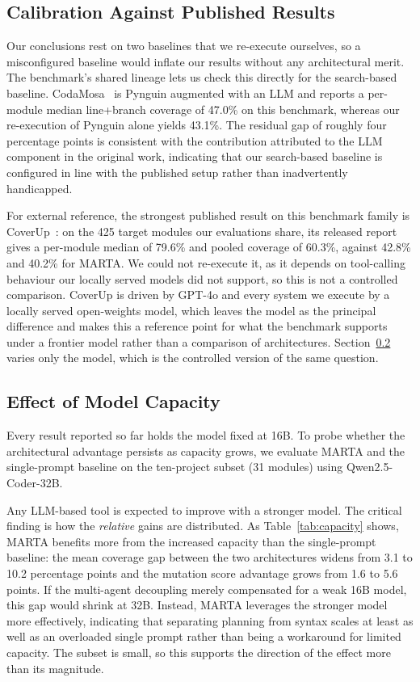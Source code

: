 \documentclass{llncs}
\begin{document}
\subsection{Calibration Against Published Results}
\label{sec:calibration}

Our conclusions rest on two baselines that we re-execute ourselves, so a
misconfigured baseline would inflate our results without any architectural merit.
The benchmark's shared lineage lets us check this directly for the search-based
baseline. CodaMosa~\cite{lemieux2023codamosa} is Pynguin augmented with an LLM and
reports a per-module median line+branch coverage of 47.0\% on this benchmark,
whereas our re-execution of Pynguin alone yields 43.1\%. The residual gap of roughly
four percentage points is consistent with the contribution attributed to the LLM
component in the original work, indicating that our search-based baseline is
configured in line with the published setup rather than inadvertently handicapped.

For external reference, the strongest published result on this benchmark family is
CoverUp~\cite{altmayer2025coverup}: on the 425 target modules our evaluations share,
its released report gives a per-module median of 79.6\% and pooled coverage of
60.3\%, against 42.8\% and 40.2\% for MARTA. We could not re-execute it, as it
depends on tool-calling behaviour our locally served models did not support, so this
is not a controlled comparison. CoverUp is driven by GPT-4o and every system we
execute by a locally served open-weights model, which leaves the model as the
principal difference and makes this a reference point for what the benchmark supports
under a frontier model rather than a comparison of architectures.
Section~\ref{sec:model-capacity} varies only the model, which is the controlled
version of the same question.


\subsection{Effect of Model Capacity}
\label{sec:model-capacity}

Every result reported so far holds the model fixed at 16B. To probe whether the architectural advantage persists as capacity grows, we evaluate MARTA and the single-prompt baseline on the ten-project subset (31 modules) using Qwen2.5-Coder-32B.

Any LLM-based tool is expected to improve with a stronger model. The critical finding
is how the \textit{relative} gains are distributed. As
Table~\ref{tab:capacity} shows, MARTA benefits more from the increased capacity than
the single-prompt baseline: the mean coverage gap between the two architectures widens
from 3.1 to 10.2 percentage points and the mutation score advantage grows from 1.6 to
5.6 points. If the multi-agent decoupling merely compensated for a weak 16B model,
this gap would shrink at 32B. Instead, MARTA leverages the stronger model more
effectively, indicating that separating planning from syntax scales at least as well
as an overloaded single prompt rather than being a workaround for limited capacity.
The subset is small, so this supports the direction of the effect more than its
magnitude.
\end{document}
